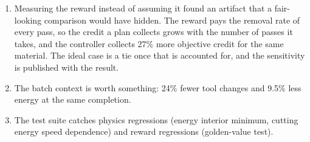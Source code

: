 \documentclass[11pt,a4paper]{article}
\begin{document}
\begin{enumerate}
    \item Measuring the reward instead of assuming it found an artifact that a fair-looking comparison would have hidden. The reward pays the removal rate of every pass, so the credit a plan collects grows with the number of passes it takes, and the controller collects 27\% more objective credit for the same material. The ideal case is a tie once that is accounted for, and the sensitivity is published with the result.
    \item The batch context is worth something: 24\% fewer tool changes and 9.5\% less energy at the same completion.
    \item The test suite catches physics regressions (energy interior minimum, cutting energy speed dependence) and reward regressions (golden-value test).
\end{enumerate}
\end{document}
